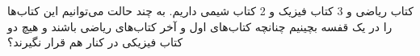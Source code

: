  کتاب ریاضی و 3 کتاب فیزیک و 2 کتاب شیمی داریم. به چند حالت می‌توانیم این کتاب‌ها را در یک قفسه بچینیم چنانچه
 کتاب‌های اول و آخر کتاب‌های ریاضی باشند و هیچ دو کتاب فیزیکی در کنار هم قرار نگیرند؟